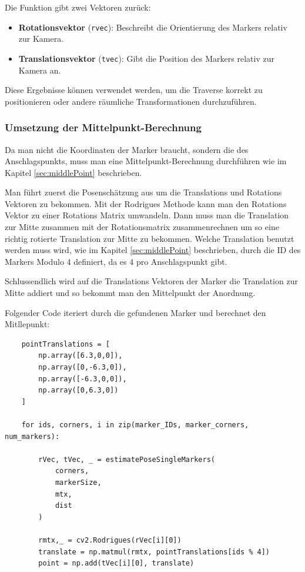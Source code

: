 Die Funktion gibt zwei Vektoren zurück:
\begin{itemize}
    \item \textbf{Rotationsvektor} (\texttt{rvec}): Beschreibt die Orientierung des Markers relativ zur Kamera.
    \item \textbf{Translationsvektor} (\texttt{tvec}): Gibt die Position des Markers relativ zur Kamera an.
\end{itemize}

Diese Ergebnisse können verwendet werden, um die Traverse korrekt zu positionieren oder andere 
räumliche Transformationen durchzuführen.


\subsubsection{Umsetzung der Mittelpunkt-Berechnung}

Da man nicht die Koordinaten der Marker braucht, sondern die des Anschlagspunkts, muss man eine 
Mittelpunkt-Berechnung durchführen wie im Kapitel \ref{sec:middlePoint} beschrieben.

Man führt zuerst die Posenschätzung aus um die Translations und Rotations Vektoren zu bekommen.
Mit der Rodrigues Methode kann man den Rotations Vektor zu einer Rotations Matrix umwandeln.
Dann muss man die Translation zur Mitte zusammen mit der Rotationsmatrix zusammenrechnen um so eine richtig rotierte Translation zur Mitte zu bekommen.
Welche Translation benutzt werden muss wird, wie im Kapitel \ref{sec:middlePoint} beschrieben, durch die ID des Markers Modulo 4 definiert, da es 4 pro Anschlagspunkt gibt.

Schlussendlich wird auf die Translations Vektoren der Marker die Translation zur Mitte addiert 
und so bekommt man den Mittelpunkt der Anordnung. \clearpage


Folgender Code iteriert durch die gefundenen Marker und berechnet den Mitllepunkt: 


\begin{lstlisting}
    pointTranslations = [
        np.array([6.3,0,0]),
        np.array([0,-6.3,0]),
        np.array([-6.3,0,0]),
        np.array([0,6.3,0])
    ]

    for ids, corners, i in zip(marker_IDs, marker_corners, num_markers):
        
        rVec, tVec, _ = estimatePoseSingleMarkers(
            corners,
            markerSize, 
            mtx, 
            dist
        )
    
        rmtx,_ = cv2.Rodrigues(rVec[i][0])
        translate = np.matmul(rmtx, pointTranslations[ids % 4])
        point = np.add(tVec[i][0], translate)
\end{lstlisting}

